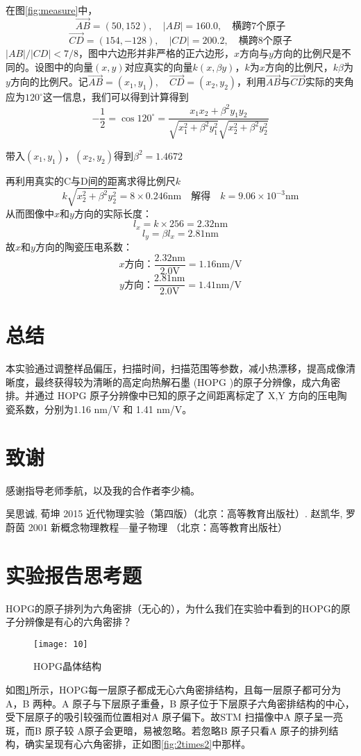 \documentclass[aps,pre,12pt,preprint,onecolumn,showpacs,showkeys]{revtex4-1}
\def \degree {^\circ}
\def \V {\mathrm{V}}
\begin{document}
在图\ref{fig:measure}中，
$$\overrightarrow{A B}=(50,152),\quad |AB|=160.0, \quad\text{横跨7个原子}$$
$$\overrightarrow{CD}=(154,-128), \quad |CD|=200.2, \quad\text{横跨8个原子}$$
$|AB|/|CD|<7/8$，图中六边形并非严格的正六边形，$x$方向与$y$方向的比例尺是不同的。设图中的向量$(x,y)$对应真实的向量$k(x,\beta y)$，$k$为$x$方向的比例尺，$k\beta$为$y$方向的比例尺。记$\overrightarrow{AB}=(x_1,y_1),\quad\overrightarrow{CD}=(x_2,y_2)$，利用$\overrightarrow{AB}$与$\overrightarrow{CD}$实际的夹角应为$120\degree$这一信息，我们可以得到计算得到
$$-\frac{1}{2}=\cos 120\degree=\frac{x_1 x_2 +\beta^2 y_1 y_2}{\sqrt{x_1^2+\beta^2 y_1^2}\sqrt{x_2^2+\beta^2 y_2^2}}$$

带入$(x_1,y_1)$，$(x_2,y_2)$得到$\beta^2=1.4672$

再利用真实的C与D间的距离求得比例尺$k$
$$k\sqrt{x_2^2+\beta^2 y_2^2}=8\times0.246\mathrm{nm} \quad\text{解得}\quad k=9.06\times 10^{-3} \mathrm{nm}$$
从而图像中$x$和$y$方向的实际长度：
$$l_x=k\times 256=2.32 \mathrm{nm}$$
$$l_y=\beta l_x=2.81 \mathrm{nm}$$
故$x$和$y$方向的陶瓷压电系数：
$$\text{$x$方向：} \frac{2.32 \mathrm{nm}}{2.0\V}=1.16 \mathrm{nm/V}$$
$$\text{$y$方向：} \frac{2.81 \mathrm{nm}}{2.0\V}=1.41 \mathrm{nm/V}$$

\section{总结}
本实验通过调整样品偏压，扫描时间，扫描范围等参数，减小热漂移，提高成像清晰度，最终获得较为清晰的高定向热解石墨 (HOPG )的原子分辨像，成六角密排。并通过 HOPG 原子分辨像中已知的原子之间距离标定了 X,Y 方向的压电陶瓷系数，分别为1.16 nm/V 和 1.41 nm/V。

\section{致谢}
感谢指导老师季航，以及我的合作者李少楠。
\begin{thebibliography}{}
 吴思诚, 荀坤 2015 近代物理实验（第四版）（北京：高等教育出版社）.
 赵凯华, 罗蔚茵 2001 新概念物理教程—量子物理 （北京：高等教育出版社）
\end{thebibliography}
\clearpage
\appendix
\section{实验报告思考题}\label{sec:q}
HOPG的原子排列为六角密排（无心的），为什么我们在实验中看到的HOPG的原子分辨像是有心的六角密排？
\begin{figure}[h]
\centering
\texttt{[image: 10]}
\caption{\label{fig:demon}%
HOPG晶体结构}
\end{figure}

如图\ref{fig:demon}所示，HOPG每一层原子都成无心六角密排结构，且每一层原子都可分为A，B 两种。A 原子与下层原子重叠，B 原子位于下层原子六角密排结构的中心，受下层原子的吸引较强而位置相对A 原子偏下。故STM 扫描像中A 原子呈一亮斑，而B 原子较 A原子会更暗，易被忽略。若忽略B 原子只看A 原子的排列结构，确实呈现有心六角密排，正如图\ref{fig:2times2}中那样。
\end{document}
